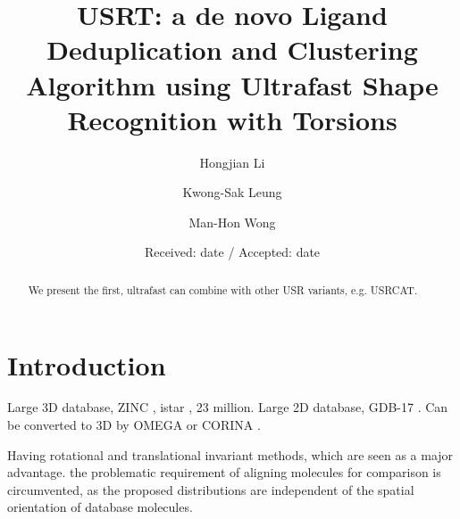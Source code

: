 \documentclass[twocolumn]{svjour3}          %
\begin{document}
\title{USRT: a de novo Ligand Deduplication and Clustering Algorithm using Ultrafast Shape Recognition with Torsions
}


\author{Hongjian Li \and Kwong-Sak Leung \and Man-Hon Wong}



\date{Received: date / Accepted: date}

\maketitle

\begin{abstract}

We present the first,
ultrafast
can combine with other USR variants, e.g. USRCAT.

\end{abstract}

\section{Introduction}

Large 3D database, ZINC \cite{532,1178}, istar \cite{1362}, 23 million.
Large 2D database, GDB-17 \cite{1276}. Can be converted to 3D by OMEGA \cite{462} or CORINA \cite{1392}.

Having rotational and translational invariant methods, which are seen as a major advantage. the problematic requirement of aligning molecules for comparison is circumvented, as the proposed distributions are independent of the spatial orientation of database molecules.
\end{document}

